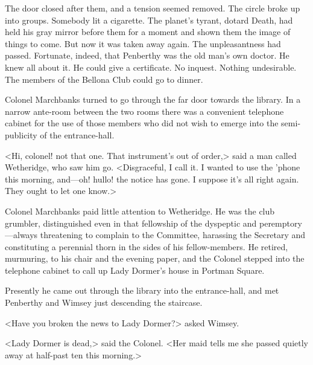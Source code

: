 The door closed after them, and a tension seemed removed. The circle broke up into groups. Somebody lit a cigarette. The planet's tyrant, dotard Death, had held his gray mirror before them for a moment and shown them the image of things to come. But now it was taken away again. The unpleasantness had passed. Fortunate, indeed, that Penberthy was the old man's own doctor. He knew all about it. He could give a certificate. No inquest. Nothing undesirable. The members of the Bellona Club could go to dinner.

Colonel Marchbanks turned to go through the far door towards the library. In a narrow ante-room between the two rooms there was a convenient telephone cabinet for the use of those members who did not wish to emerge into the semi-publicity of the entrance-hall.

<Hi, colonel! not that one. That instrument's out of order,> said a man called Wetheridge, who saw him go. <Disgraceful, I call it. I wanted to use the 'phone this morning, and—oh! hullo! the notice has gone. I suppose it's all right again. They ought to let one know.>

Colonel Marchbanks paid little attention to Wetheridge. He was the club grumbler, distinguished even in that fellowship of the dyspeptic and peremptory—always threatening to complain to the Committee, harassing the Secretary and constituting a perennial thorn in the sides of his fellow-members. He retired, murmuring, to his chair and the evening paper, and the Colonel stepped into the telephone cabinet to call up Lady Dormer's house in Portman Square.

Presently he came out through the library into the entrance-hall, and met Penberthy and Wimsey just descending the staircase.

<Have you broken the news to Lady Dormer?> asked Wimsey.

<Lady Dormer is dead,> said the Colonel. <Her maid tells me she passed quietly away at half-past ten this morning.>